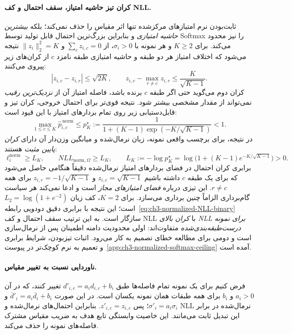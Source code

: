 \paragraph{کران تیز حاشیه امتیاز، سقف احتمال و کف NLL.}
ثابت‌بودن نرم امتیازهای مرکز‌شده
تنها اثر مقیاس را حذف نمی‌کند؛
بلکه \emph{بیشترین حاشیه امتیازی}
و بنابراین بزرگ‌ترین احتمال قابل
تولید توسط Softmax را نیز محدود می‌کند.
برای $K\ge2$ و هر نمونه با $\sigma_i>0$،
از $\sum_c z_{i,c}=0$ و
$\|z_i\|_2^2=K$ نتیجه می‌شود
که اختلاف امتیاز هر دو طبقه و
حاشیه امتیازی طبقه نامزد $c$
از کران‌های زیر پیروی می‌کنند:
\begin{equation}\label{eq:ch3-normalized-score-margin-ceilings}
\boxed{
|z_{i,c}-z_{i,r}|\le\sqrt{2K},
\qquad
z_{i,c}-\max_{r\ne c}z_{i,r}
\le\frac{K}{\sqrt{K-1}}.
}
\end{equation}
کران دوم می‌گوید حتی اگر طبقه $c$
برنده باشد، فاصله امتیاز آن از
\emph{نزدیک‌ترین رقیب} نمی‌تواند
از مقدار مشخصی بیشتر شود.
نتیجه قوی‌تر برای احتمال خروجی،
کران تیز و قابل‌دستیابی زیر روی
تمام بردارهای امتیاز با این قیود است:
\begin{equation}\label{eq:ch3-normalized-softmax-pmax}
\boxed{
\max_{1\le c\le K}\widehat p_{i,c}^{\,\mathrm{norm}}
\le p_K^\star
:=\frac{1}
{1+(K-1)\exp(-K/\sqrt{K-1})}
<1.
}
\end{equation}
در نتیجه، برای برچسب واقعی نمونه،
زیان نرمال‌شده و میانگین وزن‌دار آن
دارای \emph{کران پایین مثبت} هستند:
\begin{equation}\label{eq:ch3-normalized-NLL-positive-floor}
\boxed{
\ell_i^{\mathrm{norm}}\ge L_K,
\qquad
NLL_{\mathrm{norm},\Omega}\ge L_K,
\qquad
L_K:=-\log p_K^\star
=\log\bigl(1+(K-1)e^{-K/\sqrt{K-1}}\bigr)>0.
}
\end{equation}
برابری کران احتمال در فضای
بردارهای امتیاز نرمال‌شده
دقیقاً هنگامی حاصل می‌شود که
برای یک طبقه $c$ داشته باشیم
$z_{i,c}=\sqrt{K-1}$ و
$z_{i,r}=-1/\sqrt{K-1}$
برای همه $r\ne c$.
این تیزی درباره \emph{فضای امتیازهای مجاز}
است و ادعا نمی‌کند هر سیاست
گام‌برداری الزاماً چنین برداری می‌سازد.
برای $K=2$، کف زیان
$L_2=\log(1+e^{-2})$ است؛
این نتیجه با برابری دقیق دودویی
رابطه~\eqref{eq:ch3-normalized-NLL-binary}
سازگار است.
به این ترتیب سقف احتمال و کف NLL
با \emph{کران بالای NLL برای نمونه
درست‌طبقه‌بندی‌شده} متفاوت‌اند:
اولی محدودیت دامنه اطمینان
پس از نرمال‌سازی است و دومی
برای مطالعه خطای تصمیم به کار می‌رود.
اثبات تیزبودن، شرایط برابری و
تعمیم به نرم کوچک‌تر در
پیوست~\ref{app:ch3-normalized-softmax-ceiling}
آمده است.

\paragraph{ناوردایی نسبت به تغییر مقیاس.}
فرض کنیم برای یک نمونه تمام فاصله‌ها طبق $d'_{i,c}=a_i d_{i,c}+b_i$ تغییر کنند، که در آن $a_i>0$ و $b_i$ برای همه طبقات همان نمونه یکسان است. در این صورت $\overline d'_i=a_i\overline d_i+b_i$ و $\sigma'_i=a_i\sigma_i$؛ پس $z'_{i,c}=z_{i,c}$. بنابراین احتمال‌های نرمال‌شده و NLL نرمال‌شده در برابر این تبدیل ثابت می‌مانند. این خاصیت وابستگی تابع هدف به ضریب مقیاس مشترک فاصله‌های نمونه را حذف می‌کند.

